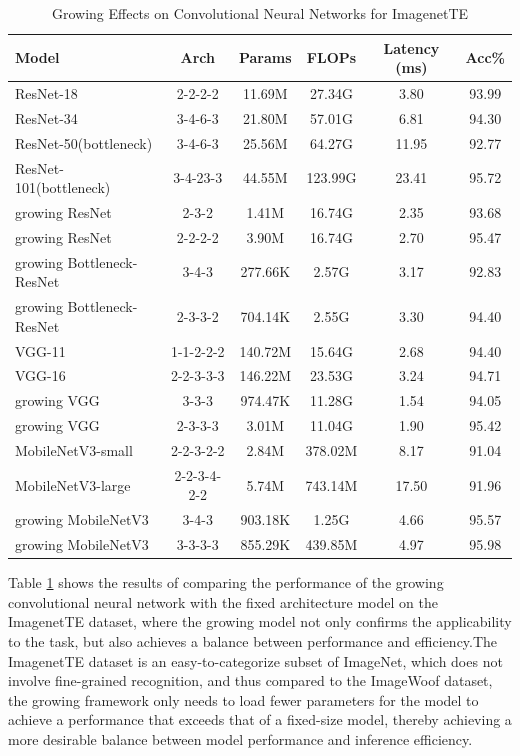 \documentclass[preprint,12pt]{elsarticle}
\begin{document}
\begin{table}[ht]
\centering
\tiny
\renewcommand{\arraystretch}{1.3}
\begin{adjustbox}{center}
\begin{tabular}{lccccc}
\hline
\textbf{Model} & \textbf{Arch} & \textbf{Params} & \textbf{FLOPs} & \textbf{Latency (ms)} & \textbf{Acc\%} \\
\hline
ResNet-18 & 2-2-2-2 & 11.69M & 27.34G & 3.80 & 93.99 \\
ResNet-34 & 3-4-6-3 & 21.80M & 57.01G & 6.81 & 94.30 \\
ResNet-50(bottleneck) & 3-4-6-3 & 25.56M & 64.27G & 11.95 & 92.77 \\
ResNet-101(bottleneck) & 3-4-23-3 & 44.55M & 123.99G & 23.41 & 95.72 \\
growing ResNet & 2-3-2 & 1.41M & 16.74G & 2.35 & 93.68 \\
growing ResNet & 2-2-2-2 & 3.90M & 16.74G & 2.70 & 95.47 \\ 
growing Bottleneck-ResNet & 3-4-3 & 277.66K & 2.57G & 3.17 & 92.83 \\
growing Bottleneck-ResNet & 2-3-3-2 & 704.14K & 2.55G & 3.30 & 94.40 \\ \hline
VGG-11 & 1-1-2-2-2 & 140.72M & 15.64G & 2.68 & 94.40 \\
VGG-16 & 2-2-3-3-3 & 146.22M & 23.53G & 3.24 & 94.71 \\
growing VGG & 3-3-3 & 974.47K & 11.28G & 1.54 & 94.05 \\
growing VGG & 2-3-3-3 & 3.01M & 11.04G & 1.90 & 95.42 \\ \hline
MobileNetV3-small & 2-2-3-2-2 & 2.84M & 378.02M & 8.17 & 91.04 \\
MobileNetV3-large & 2-2-3-4-2-2 & 5.74M & 743.14M & 17.50 & 91.96 \\
growing MobileNetV3 & 3-4-3 & 903.18K & 1.25G & 4.66 & 95.57 \\
growing MobileNetV3 & 3-3-3-3 & 855.29K & 439.85M & 4.97 & 95.98 \\
\hline
\end{tabular}
\end{adjustbox}
\caption{Growing Effects on Convolutional Neural Networks for ImagenetTE}
\label{table:imagenette_self_growth}
\end{table}

Table \ref{table:imagenette_self_growth} shows the results of comparing the performance of the growing convolutional neural network with the fixed architecture model on the ImagenetTE dataset, where the growing model not only confirms the applicability to the task, but also achieves a balance between performance and efficiency.The ImagenetTE dataset is an easy-to-categorize subset of ImageNet, which does not involve fine-grained recognition, and thus compared to the ImageWoof dataset, the growing framework only needs to load fewer parameters for the model to achieve a performance that exceeds that of a fixed-size model, thereby achieving a more desirable balance between model performance and inference efficiency.
\end{document}
